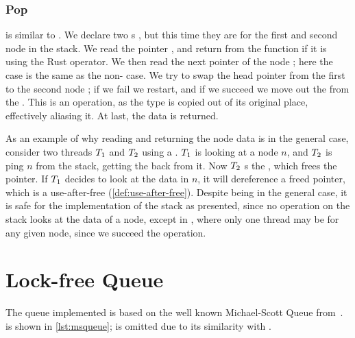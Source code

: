 \subsubsection{Pop}

 is similar to . We declare two s , but this time they
are for the first and second node in the stack. We read the  pointer , and
return from the function if it is  using the  Rust operator. We then read the
next pointer of the node ; here the  case is the same as the
non- case. We try to swap the head pointer from the first to the second node
; if we fail we restart, and if we succeed we move out the  from the
. This is an  operation, as the type is copied out of its original place,
effectively aliasing it. At last, the data is returned.

As an example of why reading and returning the node data is  in the general case,
consider two threads $T\sb{1}$ and $T\sb{2}$ using a . $T\sb{1}$ is looking at
a node $n$, and $T\sb{2}$ is ping $n$ from the stack, getting the  back from
it. Now $T\sb{2}$ s the , which frees the pointer. If $T\sb{1}$ decides to
look at the data in $n$, it will dereference a freed pointer, which is a use-after-free
(\cref{def:use-after-free}).  Despite being  in the
general case, it is safe for the implementation of the stack as presented, since no operation on
the stack looks at the data of a node, except in , where only one thread may be for
any given node, since we succeed the  operation.




\section{Lock-free Queue\label{sec:usage-queue}}


The queue implemented is based on the well known Michael-Scott Queue from~\cite{michael1996simple}.
 is shown in \cref{lst:msqueue};  is omitted due to its similarity with
.

\begin{figure}[ht]

\end{figure}


